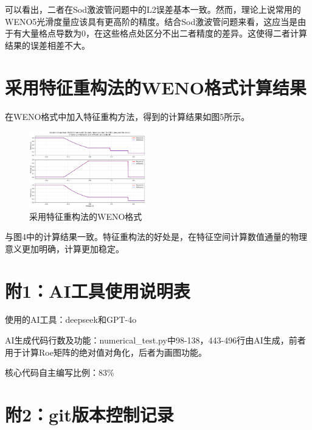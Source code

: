 \documentclass[12pt, a4paper]{article}
\begin{document}
可以看出，二者在Sod激波管问题中的L2误差基本一致。然而，理论上说常用的WENO5光滑度量应该具有更高阶的精度。结合Sod激波管问题来看，这应当是由于有大量格点导数为0，在这些格点处区分不出二者精度的差异。这使得二者计算结果的误差相差不大。

\section{采用特征重构法的WENO格式计算结果}
在WENO格式中加入特征重构方法，得到的计算结果如图5所示。
\begin{figure}[htbp]
    \centering
    \includegraphics[width=0.45\textwidth]{./pictures/Solution Comparison (WENO Scheme with Charastic Reconstruction, N=1001, Jiang and Shu et al.).png} 
    \caption{采用特征重构法的WENO格式}
\end{figure}
与图4中的计算结果一致。特征重构法的好处是，在特征空间计算数值通量的物理意义更加明确，计算更加稳定。

\section*{附1：AI工具使用说明表}
使用的AI工具：deepseek和GPT-4o

AI生成代码行数及功能：numerical\_test.py中98-138，443-496行由AI生成，前者用于计算Roe矩阵的绝对值对角化，后者为画图功能。

核心代码自主编写比例：83\%

\section*{附2：git版本控制记录}
\begin{figure}[htbp]
\end{figure}
\end{document}

